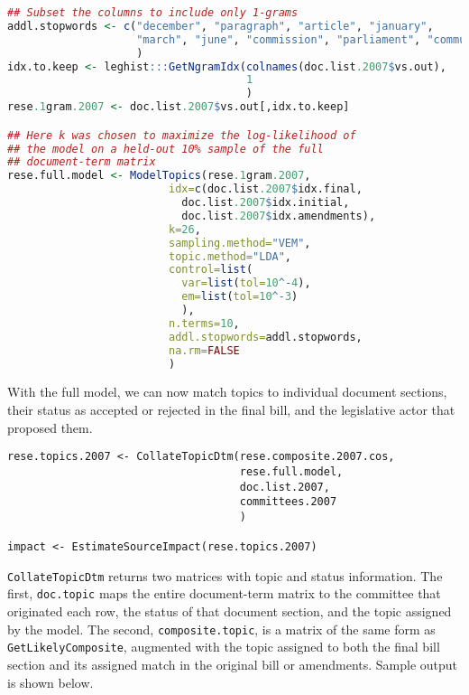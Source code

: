\documentclass[11pt]{article}
\begin{document}
\begin{lstlisting}[language=R, numbers=none]
## Subset the columns to include only 1-grams
addl.stopwords <- c("december", "paragraph", "article", "january",
                    "march", "june", "commission", "parliament", "community"
                    )
idx.to.keep <- leghist:::GetNgramIdx(colnames(doc.list.2007$vs.out),
                                     1
                                     )
rese.1gram.2007 <- doc.list.2007$vs.out[,idx.to.keep]

## Here k was chosen to maximize the log-likelihood of 
## the model on a held-out 10% sample of the full 
## document-term matrix
rese.full.model <- ModelTopics(rese.1gram.2007,
                         idx=c(doc.list.2007$idx.final,
                           doc.list.2007$idx.initial,
                           doc.list.2007$idx.amendments),
                         k=26,
                         sampling.method="VEM",
                         topic.method="LDA",
                         control=list(
                           var=list(tol=10^-4),
                           em=list(tol=10^-3)
                           ),
                         n.terms=10,
                         addl.stopwords=addl.stopwords,
                         na.rm=FALSE
                         )  
\end{lstlisting}



With the full model, we can now match topics to individual document
sections, their status as accepted or rejected in the final bill, and
the legislative actor that proposed them.

\begin{lstlisting}
rese.topics.2007 <- CollateTopicDtm(rese.composite.2007.cos,
                                    rese.full.model,
                                    doc.list.2007,
                                    committees.2007
                                    )

impact <- EstimateSourceImpact(rese.topics.2007)
\end{lstlisting}

\texttt{CollateTopicDtm} returns two matrices with topic and status
information. The first, \texttt{doc.topic} maps the entire document-term matrix to the
committee that originated each row, the status of that document
section, and the topic assigned by the model. The second,
\texttt{composite.topic}, is a matrix of the same form as
\texttt{GetLikelyComposite}, augmented with the topic assigned to both
the final bill section and its assigned match in the original bill or
amendments. Sample output is shown below.
\end{document}
